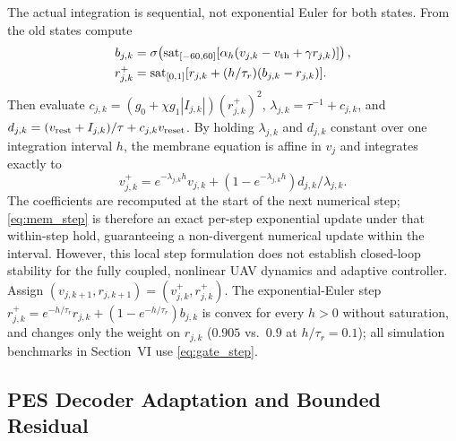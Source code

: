 \documentclass[letterpaper, 10 pt, conference]{ieeeconf}
\newcommand{\sat}{\operatorname{sat}}
\begin{document}
The actual integration is sequential, not exponential Euler for both
states. From the old states compute
\begin{align}
 b_{j,k}&=\sigma\!\left(\sat_{[-60,60]}
       [\alpha_h(v_{j,k}-v_{\rm th}+\gamma r_{j,k})]\right),\\
 r_{j,k}^{+}&=\sat_{[0,1]}
       [r_{j,k}+(h/\tau_r)(b_{j,k}-r_{j,k})].
 \label{eq:gate_step}
\end{align}
Then evaluate $c_{j,k}=(g_0+\chi g_1|I_{j,k}|)(r_{j,k}^{+})^2$,
$\lambda_{j,k}=\tau^{-1}+c_{j,k}$, and
$d_{j,k}=(v_{\rm rest}+I_{j,k})/\tau+c_{j,k}v_{\rm reset}$. By holding $\lambda_{j,k}$ and $d_{j,k}$ constant over one integration interval $h$, the membrane equation is affine in $v_j$ and integrates exactly to
\begin{equation}
 v_{j,k}^{+}=e^{-\lambda_{j,k}h}v_{j,k}
       +(1-e^{-\lambda_{j,k}h})d_{j,k}/\lambda_{j,k}.
 \label{eq:mem_step}
\end{equation}
The coefficients are recomputed at the start of the next numerical step; \eqref{eq:mem_step} is therefore an exact per-step exponential update under that within-step hold, guaranteeing a non-divergent numerical update within the interval. However, this local step formulation does not establish closed-loop stability for the fully coupled, nonlinear UAV dynamics and adaptive controller. Assign $(v_{j,k+1},r_{j,k+1})=(v_{j,k}^{+},r_{j,k}^{+})$.
The exponential-Euler step $r_{j,k}^{+}=e^{-h/\tau_r}r_{j,k}+(1-e^{-h/\tau_r})b_{j,k}$ is
convex for every $h>0$ without saturation, and changes only the weight on $r_{j,k}$
($0.905$ vs.\ $0.9$ at $h/\tau_r=0.1$); all simulation benchmarks in Section~VI use \eqref{eq:gate_step}.



\subsection{PES Decoder Adaptation and Bounded Residual}
\end{document}

